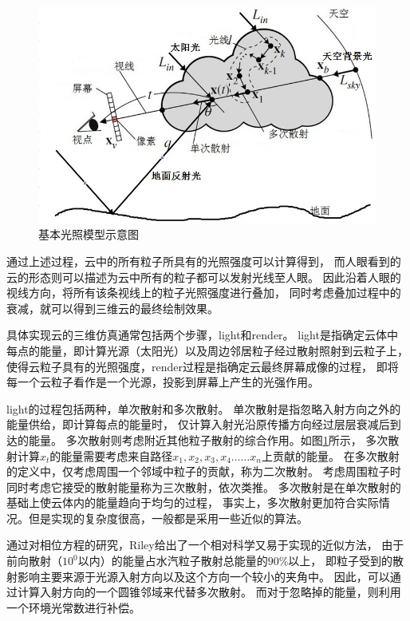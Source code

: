 \begin{figure}
	\centering
	\includegraphics{figure/base_light_model.jpg}
	\caption{基本光照模型示意图}
	\label{fig:base_light_model}
\end{figure}

通过上述过程，云中的所有粒子所具有的光照强度可以计算得到，
而人眼看到的云的形态则可以描述为云中所有的粒子都可以发射光线至人眼。
因此沿着人眼的视线方向，将所有该条视线上的粒子光照强度进行叠加，
同时考虑叠加过程中的衰减，就可以得到三维云的最终绘制效果。

具体实现云的三维仿真通常包括两个步骤，light和render。
light是指确定云体中每点的能量，即计算光源（太阳光）以及周边邻居粒子经过散射照射到云粒子上，
使得云粒子具有的光照强度，render过程是指确定云最终屏幕成像的过程，
即将每一个云粒子看作是一个光源，投影到屏幕上产生的光强作用。

light的过程包括两种，单次散射和多次散射。
单次散射是指忽略入射方向之外的能量供给，即计算每点的能量时，
仅计算入射光沿原传播方向经过层层衰减后到达的能量。
多次散射则考虑附近其他粒子散射的综合作用。如图\ref{fig:base_light_model}所示，
多次散射计算$x_t$的能量需要考虑来自路径$x_1,x_2,x_3,x_4\dots{}\dots{}x_n$上贡献的能量。
在多次散射的定义中，仅考虑周围一个邻域中粒子的贡献，称为二次散射。
考虑周围粒子时同时考虑它接受的散射能量称为三次散射，依次类推。
多次散射是在单次散射的基础上使云体内的能量趋向于均匀的过程，
事实上，多次散射更加符合实际情况。但是实现的复杂度很高，一般都是采用一些近似的算法。

通过对相位方程的研究，Riley给出了一个相对科学又易于实现的近似方法，
由于前向散射（$10^0$以内）的能量占水汽粒子散射总能量的$90\%$以上，
即粒子受到的散射影响主要来源于光源入射方向以及这个方向一个较小的夹角中。
因此，可以通过计算入射方向的一个圆锥邻域来代替多次散射。
而对于忽略掉的能量，则利用一个环境光常数进行补偿。

